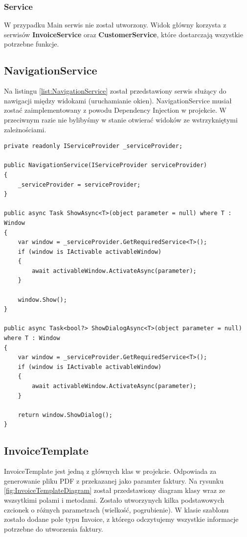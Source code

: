 \subsubsection{Service}

W przypadku Main serwis nie został utworzony. Widok główny korzysta z serwisów \textbf{InvoiceService} oraz \textbf{CustomerService}, które dostarczają wszystkie potrzebne funkcje.

\subsection{NavigationService}
Na listingu \ref{list:NavigationService} został przedstawiony serwis służący do nawigacji między widokami (uruchamianie okien). NavigationService musiał zostać zaimplementowany z powodu Dependency Injection w projekcie. W przeciwnym razie nie bylibyśmy w stanie otwierać widoków ze wstrzykniętymi zależnościami.

\begin{lstlisting}[language={[Sharp]C},label=list:NavigationService,caption=Serwis do nawigacji między widokami, basicstyle=\footnotesize\ttfamily]
private readonly IServiceProvider _serviceProvider;

public NavigationService(IServiceProvider serviceProvider)
{
    _serviceProvider = serviceProvider;
}

public async Task ShowAsync<T>(object parameter = null) where T : Window
{
    var window = _serviceProvider.GetRequiredService<T>();
    if (window is IActivable activableWindow)
    {
        await activableWindow.ActivateAsync(parameter);
    }

    window.Show();
}

public async Task<bool?> ShowDialogAsync<T>(object parameter = null) where T : Window
{
    var window = _serviceProvider.GetRequiredService<T>();
    if (window is IActivable activableWindow)
    {
        await activableWindow.ActivateAsync(parameter);
    }

    return window.ShowDialog();
}
\end{lstlisting}

\subsection{InvoiceTemplate}
InvoiceTemplate jest jedną z głównych klas w projekcie. Odpowiada za generowanie pliku PDF z przekazanej jako paramter faktury. Na rysunku \ref{fig:InvoiceTemplateDiagram} został przedstawiony diagram klasy wraz ze wszsytkimi polami i metodami. Zostało utworzynych kilka podstawowych czcionek o różnych parametrach (wielkość, pogrubienie). W klasie szablonu zostało dodane pole typu Invoice, z którego odczytujemy wszystkie informacje potrzebne do utworzenia faktury. 

